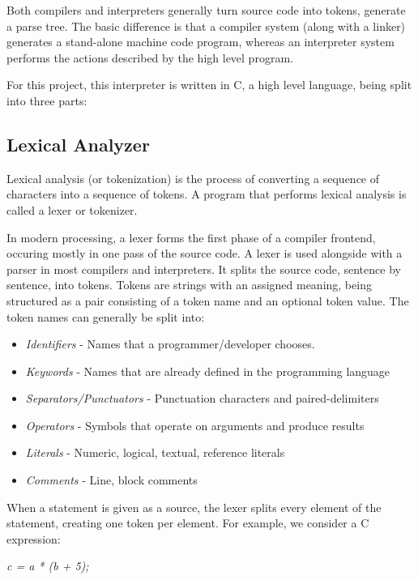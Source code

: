 \documentclass[12pt,a4paper,twoside]{report}
\begin{document}
Both compilers and interpreters generally turn source code into tokens, generate a parse tree. The basic difference is that a compiler system (along with a linker) generates a stand-alone machine code program, whereas an interpreter system performs the actions described by the high level program.

For this project, this interpreter is written in C, a high level language, being split into three parts:
\subsection{Lexical Analyzer}
	
	Lexical analysis (or tokenization) is the process of converting a sequence of characters into a sequence of tokens. A program that performs lexical analysis is called a lexer or tokenizer.
	
	In modern processing, a lexer forms the first phase of a compiler frontend, occuring mostly in one pass of the source code. A lexer is used alongside with a parser in most compilers and interpreters. It splits the source code, sentence by sentence, into tokens. Tokens are strings with an assigned meaning, being structured as a pair consisting of a token name and an optional token value. The token names can generally be split into:
	
	\begin{itemize}
		\item \textit{Identifiers} - Names that a programmer/developer chooses.
		\item \textit{Keywords} - Names that are already defined in the programming language
		\item \textit{Separators/Punctuators} - Punctuation characters and paired-delimiters
		\item \textit{Operators} - Symbols that operate on arguments and produce results
		\item \textit{Literals} - Numeric, logical, textual, reference literals
		\item \textit{Comments} - Line, block comments 
	\end{itemize}
	
	When a statement is given as a source, the lexer splits every element of the statement, creating one token per element. For example, we consider a C expression: 
	
	\textit{c = a * (b + 5);}
	
\end{document}
